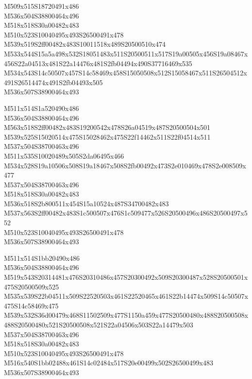 \documentclass{article}
\begin{document}
\begin{multicols}{5}
\begin{center}

M509x515S18720491x486 %
\\M536x504S38800464x496 %
\\M518x518S30a00482x483 %
\\M510x523S10040495x493S26500491x478 %
\\M539x519S2ff00482x483S10011518x489S20500510x474 %
\\M533x544S15a5a498x532S18051483x511S20500511x517S19a00505x456S19a08467x456S22a04513x481S22a14476x481S2fb04494x490S37716469x535 %
\\M534x543S14c50507x457S14c58469x458S15050508x512S15058467x511S26504512x491S26514474x491S2fb04493x505 %
\\M536x507S38900464x493 %
\vfil
\columnbreak

M511x514S1a520490x486 %
\\M536x504S38800464x496 %
\\M563x518S2ff00482x483S19200542x478S26a04519x487S20500504x501 %
\\M539x525S15020514x475S15028462x475S22f14462x511S22f04514x511 %
\\M537x504S38700463x496 %
\\M511x535S10020489x505S2da06495x466 %
\\M534x528S19a10506x508S19a18467x508S2fb00492x473S2e010469x478S2e008509x477 %
\\M537x504S38700463x496 %
\\M518x518S30a00482x483 %
\\M536x518S2b800511x454S15a10524x487S34700482x483 %
\\M537x563S2ff00482x483S1c500507x476S1c509477x526S20500496x486S20500497x552 %
\\M510x523S10040495x493S26500491x478 %
\\M536x507S38900464x493 %
\vfil
\columnbreak

M511x514S1bb20490x486 %
\\M536x504S38800464x496 %
\\M519x543S20314481x476S20310486x457S20300492x509S20300487x528S20500501x475S20500509x525 %
\\M535x539S22b04511x509S22520503x461S22520465x461S22b14474x509S14c50507x475S14c58469x475 %
\\M539x532S36d00479x468S11502509x477S1150a459x477S20500480x488S20500508x488S20500480x521S20500508x521S22a04506x503S22a14479x503 %
\\M537x504S38700463x496 %
\\M518x518S30a00482x483 %
\\M510x523S10040495x493S26500491x478 %
\\M516x540S1bb02488x461S14c02484x517S20e00499x502S26500499x483 %
\\M536x507S38900464x493 %
\vfil
\columnbreak


\end{center}
\end{multicols}
\end{document}
